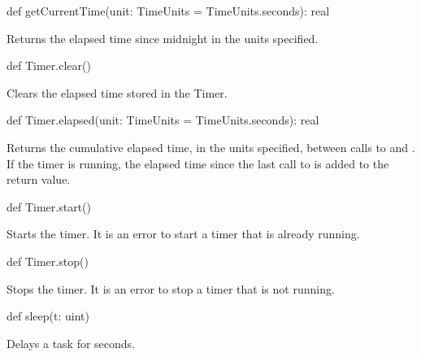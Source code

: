\begin{protohead}
def getCurrentTime(unit: TimeUnits = TimeUnits.seconds): real
\end{protohead}
\begin{protobody}
Returns the elapsed time since midnight in the units specified.
\end{protobody}

\begin{protohead}
def Timer.clear()
\end{protohead}
\begin{protobody}
Clears the elapsed time stored in the Timer.
\end{protobody}

\begin{protohead}
def Timer.elapsed(unit: TimeUnits = TimeUnits.seconds): real
\end{protohead}
\begin{protobody}
Returns the cumulative elapsed time, in the units specified, between
calls to  and .  If the timer is running, the
elapsed time since the last call to  is added to the
return value.
\end{protobody}

\begin{protohead}
def Timer.start()
\end{protohead}
\begin{protobody}
Starts the timer.  It is an error to start a timer that is already
running.
\end{protobody}

\begin{protohead}
def Timer.stop()
\end{protohead}
\begin{protobody}
Stops the timer.  It is an error to stop a timer that is not running.
\end{protobody}

\begin{protohead}
def sleep(t: uint)
\end{protohead}
\begin{protobody}
Delays a task for  seconds.
\end{protobody}

